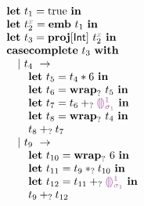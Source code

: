 


  \[\begin{array}{l}
    \ELet{t_1}{\ETrue} \EInn \\
    \ELet{\ENamed{2}{x}}{\EEmbedPrim{t_1}} \EInn \\
    \ELet{t_3}{\EProj{\ENamed{2}{x}}{\TCInt}} \EInn \\

    \EBranchWith{t_3} \\
      \Indent \EBranchBr{t_4}{} \\
        \Indent \Indent \ELet{t_5}{\ETimesPrim{t_4}{6}} \EInn \\
        \Indent \Indent \ELet{t_6}{\EWrapIndet{t_5}} \EInn \\
        \Indent \Indent \ELet{t_7}{\EPlusIndet{t_6}{\EEHole{1}{\sigma_1}}} \EInn \\
        \Indent \Indent \ELet{t_8}{\EWrapIndet{t_4}} \EInn \\
        \Indent \Indent \EPlusIndet{t_8}{t_7} \\
      \Indent \EBranchBr{t_{9}}{} \\
        \Indent \Indent \ELet{t_{10}}{\EWrapIndet{6}} \EInn \\
        \Indent \Indent \ELet{t_{11}}{\ETimesIndet{t_{9}}{t_{10}}} \EInn \\
        \Indent \Indent \ELet{t_{12}}{\EPlusIndet{t_{11}}{\EEHole{1}{\sigma_1}}} \EInn \\
        \Indent \Indent \EPlusIndet{t_{9}}{t_{12}}
  \end{array}\]

